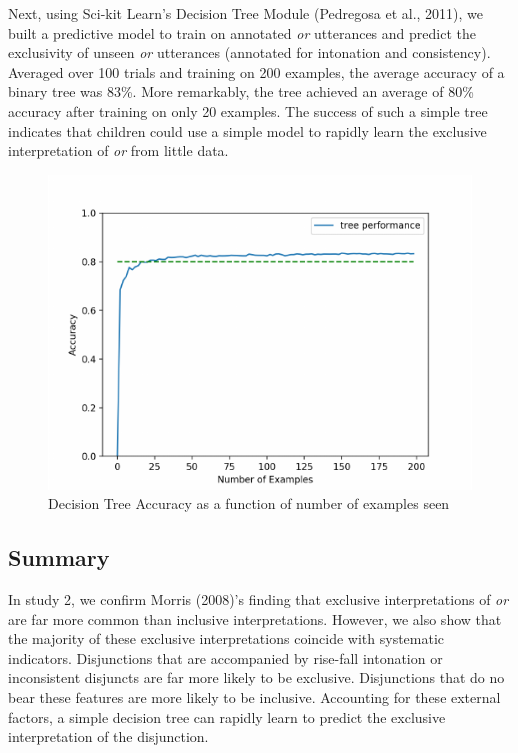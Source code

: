 \documentclass[10pt, letterpaper]{article}
\newenvironment{CodeChunk}{}{}
\begin{document}
Next, using Sci-kit Learn's Decision Tree Module (Pedregosa et al.,
2011), we built a predictive model to train on annotated \emph{or}
utterances and predict the exclusivity of unseen \emph{or} utterances
(annotated for intonation and consistency). Averaged over 100 trials and
training on 200 examples, the average accuracy of a binary tree was
83\%. More remarkably, the tree achieved an average of 80\% accuracy
after training on only 20 examples. The success of such a simple tree
indicates that children could use a simple model to rapidly learn the
exclusive interpretation of \emph{or} from little data.

\begin{CodeChunk}
\begin{figure}[h]

{\centering \includegraphics{figs/learningCurve-1} 

}

\caption[Decision Tree Accuracy as a function of number of examples seen]{Decision Tree Accuracy as a function of number of examples seen}\label{fig:learningCurve}
\end{figure}
\end{CodeChunk}

\subsection{Summary}\label{summary-1}

In study 2, we confirm Morris (2008)'s finding that exclusive
interpretations of \emph{or} are far more common than inclusive
interpretations. However, we also show that the majority of these
exclusive interpretations coincide with systematic indicators.
Disjunctions that are accompanied by rise-fall intonation or
inconsistent disjuncts are far more likely to be exclusive. Disjunctions
that do no bear these features are more likely to be inclusive.
Accounting for these external factors, a simple decision tree can
rapidly learn to predict the exclusive interpretation of the
disjunction.
\end{document}

